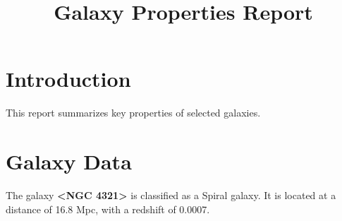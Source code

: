 \documentclass{article}
\title{Galaxy Properties Report}
\author{}
\date{}
\begin{document}
\maketitle

\section{Introduction}
This report summarizes key properties of selected galaxies.

\section{Galaxy Data}
The galaxy \textbf{<NGC 4321>} is classified as a Spiral galaxy. 
It is located at a distance of 16.8 Mpc, with a redshift of 0.0007.
\end{document}
